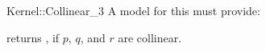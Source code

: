 \begin{ccRefFunctionObjectConcept}{Kernel::Collinear_3}
A model for this must provide:


{returns , if $p$, $q$, and $r$ are collinear.}

\end{ccRefFunctionObjectConcept}
